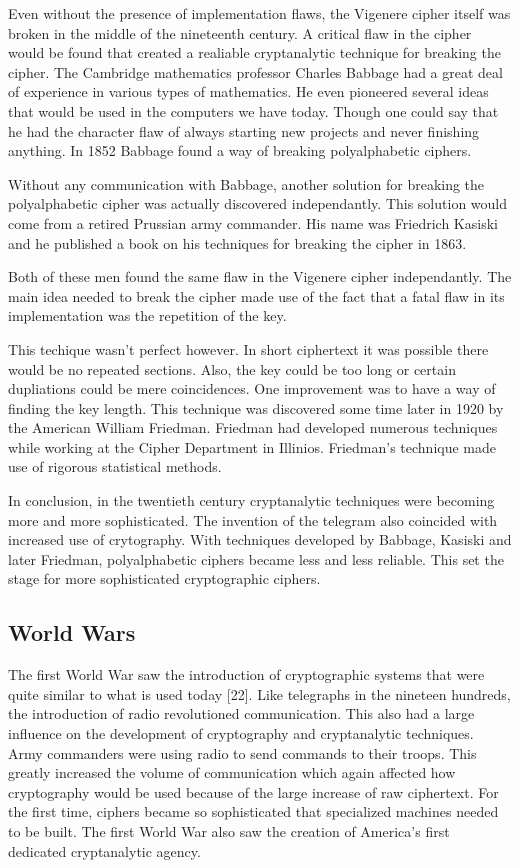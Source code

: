 \documentclass{article}
\begin{document}
    Even without the presence of implementation flaws, the Vigenere cipher itself was
    broken in the middle of the nineteenth century. A critical flaw in the cipher
    would be found that created a realiable cryptanalytic technique for breaking
    the cipher.
    The Cambridge mathematics professor Charles Babbage had a great deal of
    experience in various types of mathematics. He even pioneered several ideas
    that would be used in the computers we have today. Though one could say that
    he had the character flaw of always starting new projects and never finishing anything.
    In 1852 Babbage found a way of breaking polyalphabetic ciphers.

    Without any communication with Babbage, another solution for breaking the polyalphabetic
    cipher was actually discovered independantly. This solution would come
    from a retired Prussian army commander. His name was Friedrich Kasiski and he published
    a book on his techniques for breaking the cipher in 1863.

    Both of these men found the same flaw in the Vigenere cipher independantly.
    The main idea needed to break the cipher made use of the fact that a fatal
    flaw in its implementation was the repetition of the key.

    This techique wasn't perfect however. In short ciphertext it was possible there
    would be no repeated sections. Also, the key could be too long or certain dupliations
    could be mere coincidences.
    One improvement was to have a way of finding the key length. This technique was
    discovered some time later in 1920 by the American William Friedman. Friedman had
    developed numerous techniques while working at the Cipher Department in Illinios.
    Friedman's technique made use of rigorous statistical methods.

    In conclusion, in the twentieth century cryptanalytic techniques were becoming
    more and more sophisticated. The invention of the telegram also coincided
    with increased use of crytography. With techniques developed by Babbage,
    Kasiski and later Friedman, polyalphabetic ciphers became less and less reliable.
    This set the stage for more sophisticated cryptographic ciphers.

    \subsection{World Wars}

    The first World War saw the introduction of cryptographic systems that
    were quite similar to what is used today [22]. Like telegraphs in the nineteen
    hundreds, the introduction of radio revolutioned communication.
    This also had a large influence on the development of cryptography and cryptanalytic
    techniques. Army commanders were using radio to send commands to their troops.
    This greatly increased the volume of communication which again affected how
    cryptography would be used because of the large increase of raw ciphertext.
    For the first time, ciphers became so sophisticated that specialized machines
    needed to be built. The first World War also saw the creation of America's
    first dedicated cryptanalytic agency.
\end{document}
